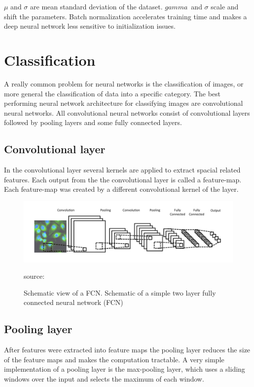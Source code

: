 \(\mu\) and \(\sigma\) are mean standard deviation of the dataset. 
\(gamma\)\ and \(\sigma\) scale and shift the parameters. Batch normalization accelerates training time and makes a deep neural network less sensitive to initialization issues.

\section{Classification}
A really common problem for neural networks is the classification of images, or more general the classification of data into a specific category. The best performing neural network architecture for classifying images are convolutional neural networks. All convolutional neural networks consist of convolutional layers followed by pooling layers and some fully connected layers.

\subsection{Convolutional layer}
In the convolutional layer several kernels are applied to extract spacial related features. Each output from the the convolutional layer is called a feature-map. Each feature-map was created by a different convolutional kernel of the layer. 

\begin{figure}[H]
	\centering
	\includegraphics[width=\linewidth]{bilder/grundlagen/convolution.png}
	\caption{Schematic view of a FCN. Schematic of a simple two layer fully connected neural network (FCN)} source:\cite{Component}
	\label{fig:COMPONENT}
\end{figure}

\subsection{Pooling layer}
After features were extracted into feature maps the pooling layer reduces the size of the feature maps and makes the computation tractable. A very simple implementation of a pooling layer is the max-pooling layer, which uses a sliding windows over the input and selects the maximum of each window.

